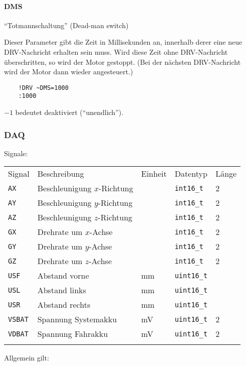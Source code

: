 \paragraph{DMS}

"`Totmannschaltung"' (Dead-man switch)

Dieser Parameter gibt die Zeit in Millisekunden an, innerhalb derer eine neue DRV-Nachricht erhalten sein muss. Wird diese Zeit ohne DRV-Nachricht überschritten, so wird der Motor gestoppt. (Bei der nächsten DRV-Nachricht wird der Motor dann wieder angesteuert.)

\begin{verbatim}
	!DRV ~DMS=1000
	:1000
\end{verbatim}

$-1$ bedeutet deaktiviert ("`unendlich"').


\subsubsection{DAQ}


Signale:\\
\begin{tabular}{lllll}
	\mytoprule
	Signal & Beschreibung & Einheit & Datentyp & Länge \\
	\mymidrule
	\verb|AX| & Beschleunigung $x$-Richtung &  & \verb|int16_t| & 2 \\
	\verb|AY| & Beschleunigung $y$-Richtung &  & \verb|int16_t| & 2 \\
	\verb|AZ| & Beschleunigung $z$-Richtung &  & \verb|int16_t| & 2 \\
	\verb|GX| & Drehrate um $x$-Achse & & \verb|int16_t| & 2 \\
	\verb|GY| & Drehrate um $y$-Achse & & \verb|int16_t| & 2 \\
	\verb|GZ| & Drehrate um $z$-Achse & & \verb|int16_t| & 2 \\
	\verb|USF| & Abstand vorne & mm & \verb|uint16_t| & \\
	\verb|USL| & Abstand links & mm & \verb|uint16_t| & \\
	\verb|USR| & Abstand rechts & mm & \verb|uint16_t| & \\
	\verb|VSBAT| & Spannung Systemakku & mV & \verb|uint16_t| & 2\\
	\verb|VDBAT| & Spannung Fahrakku & mV & \verb|uint16_t| & 2\\
	\mybottomrule
\end{tabular}

Allgemein gilt:

